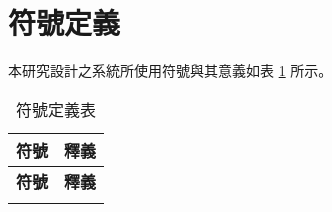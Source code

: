 \section{符號定義}

    本研究設計之系統所使用符號與其意義如表 \ref{table:tab.symbol} 所示。

\begin{longtable}{c l}
    \caption{符號定義表} \label{table:tab.symbol} \\

    \hline
    \multicolumn{1}{c}{\bf{符號}} & \multicolumn{1}{c}{\bf{釋義}} \\
    \hline
    \endfirsthead

    \multicolumn{1}{c}{\bf{符號}} & \multicolumn{1}{c}{\bf{釋義}} \\
    \hline
    \endhead

    \hline
    \endlastfoot


\end{longtable}
